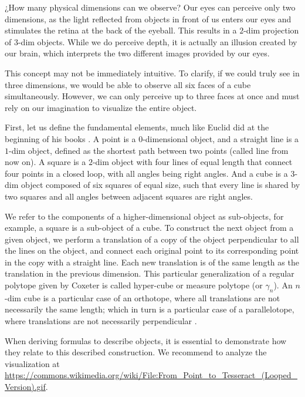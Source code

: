 \documentclass{article}
\begin{document}
	¿How many physical dimensions can we observe? Our eyes can perceive only two dimensions, as the light reflected from objects in front of us enters our eyes and stimulates the retina at the back of the eyeball. This results in a $2$-dim projection of $3$-dim objects. While we do perceive depth, it is actually an illusion created by our brain, which interprets the two different images provided by our eyes.
	
	This concept may not be immediately intuitive. To clarify, if we could truly see in three dimensions, we would be able to observe all six faces of a cube simultaneously. However, we can only perceive up to three faces at once and must rely on our imagination to visualize the entire object.
	
	First, let us define the fundamental elements, much like Euclid did at the beginning of his books \cite{euclid}. A point is a $0$-dimensional object, and a straight line is a $1$-dim object, defined as the shortest path between two points (called line from now on). A square is a $2$-dim object with four lines of equal length that connect four points in a closed loop, with all angles being right angles. And a cube is a $3$-dim object composed of six squares of equal size, such that every line is shared by two squares and all angles between adjacent squares are right angles.

	We refer to the components of a higher-dimensional object as sub-objects, for example, a square is a sub-object of a cube. To construct the next object from a given object, we perform a translation of a copy of the object perpendicular to all the lines on the object, and connect each original point to its corresponding point in the copy with a straight line. Each new translation is of the same length as the translation in the previous dimension. This particular generalization of a regular polytope given by Coxeter \cite{coxeter1973regular} is called hyper-cube or measure polytope (or $\gamma_n$). An $n$-dim cube is a particular case of an orthotope, where all translations are not necessarily the same length; which in turn is a particular case of a parallelotope, where translations are not necessarily perpendicular \cite{coxeter1973regular}.
	
	When deriving formulas to describe objects, it is essential to demonstrate how they relate to this described construction. We recommend to analyze the visualization at \url{https://commons.wikimedia.org/wiki/File:From_Point_to_Tesseract_(Looped_Version).gif}.
	
\end{document}
